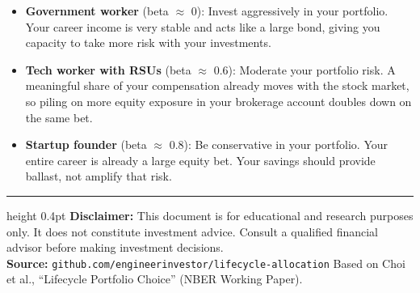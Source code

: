 \documentclass[12pt]{article}
\begin{document}
\begin{itemize}[leftmargin=1.5em, itemsep=0.6em]
  \item \textbf{Government worker} (beta $\approx$ 0): Invest aggressively in your
    portfolio. Your career income is very stable and acts like a large bond, giving
    you capacity to take more risk with your investments.

  \item \textbf{Tech worker with RSUs} (beta $\approx$ 0.6): Moderate your portfolio
    risk. A meaningful share of your compensation already moves with the stock market,
    so piling on more equity exposure in your brokerage account doubles down on the
    same bet.

  \item \textbf{Startup founder} (beta $\approx$ 0.8): Be conservative in your
    portfolio. Your entire career is already a large equity bet. Your savings should
    provide ballast, not amplify that risk.
\end{itemize}

\vfill

\hrule height 0.4pt
\vspace{0.5em}
{\footnotesize\color{gray}
\textbf{Disclaimer:} This document is for educational and research purposes only.
It does not constitute investment advice. Consult a qualified financial advisor before
making investment decisions.\\[0.3em]
\textbf{Source:} \texttt{github.com/engineerinvestor/lifecycle-allocation} \enspace
\textbar\enspace Based on Choi et al., ``Lifecycle Portfolio Choice'' (NBER Working Paper).}
\end{document}

